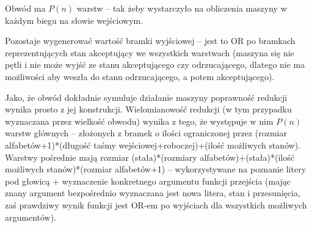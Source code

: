 \documentclass{article}
\begin{document}
Obwód ma $P(n)$ warstw -- tak żeby wystarczyło na obliczenia maszyny w każdym biegu na słowie wejściowym.

Pozostaje wygenerować wartość bramki wyjściowej -- jest to OR po bramkach reprezentujących stan akceptujący we wszystkich warstwach
(maszyna się nie pętli i nie może wyjść ze stanu akceptującego czy odrzucającego,
dlatego nie ma możliwości aby weszła do stanu odrzucającego, a potem akceptującego).\newline

Jako, że obwód dokładnie symuluje działanie maszyny poprawność redukcji wynika prosto z jej konstrukcji.\newline
Wielomianowość redukcji (w tym przypadku wyznaczana przez wielkość obwodu) wynika z tego, że występuje w nim
$P(n)$ warstw głównych -- złożonych z bramek o ilości ograniczonej przez
(rozmiar alfabetów+1)*(długość taśmy wejściowej+roboczej)+(ilość możliwych stanów).
Warstwy pośrednie mają rozmiar (stała)*(rozmiary alfabetów)+(stała)*(ilość możliwych stanów)*(rozmiar alfabetów+1) --
wykorzystywane na poznanie litery pod głowicą + wyznaczenie konkretnego argumentu funkcji przejścia
(mając znany argument bezpośrednio wyznaczana jest nowa litera, stan i przesunięcia,
zaś prawdziwy wynik funkcji jest OR-em po wyjściach dla wszystkich możliwych argumentów).
\end{document}
